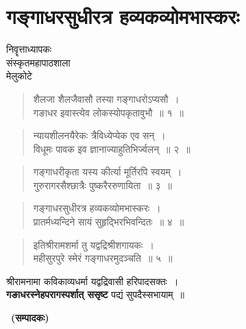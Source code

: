 {\fontsize{15}{17}\selectfont
\chapter{गङ्गाधरसुधीरत्र हव्यकव्योमभास्करः}

\begin{center}
\smallskip

निवॄत्ताध्यापकः\\
संस्कृतमहापाठशाला\\
मेलुकोटे
\addrule
\end{center}

\begin{verse}
शैलजा शैलजैवासौ तस्या गङ्गाधरोऽप्यसौ~।\\
गङाधर इवास्त्येव लोकस्योपकृतावुभौ~॥ १~॥
\end{verse}

\begin{verse}
न्यायशीलनयैरेकः त्रैविध्येप्येक एव सन्~।\\
विधूमः पावक इव ज्ञानाज्याहुतिभिर्ज्वलन्~॥ २~॥
\end{verse}

\begin{verse}
गङ्गाधरीकृता यस्य कीर्त्या मूर्तिरपि स्वयम्~।\\
गुरुरागरसैश्छात्रैः पुष्करैररुणायिता~॥ ३~॥
\end{verse}

\begin{verse}
गङ्गाधरसुधीरत्र हव्यकव्योमभास्करः~।\\
प्रातर्मध्यन्दिने सायं सुहृद्भिरभिवन्दितः~॥ ४~॥
\end{verse}

\begin{verse} 
इतिश्रीरामशर्मा तु यद्वद्रिश्रीशगायकः~।\\
महीसुरपुरे स्मेरं गङ्गाधरमुदञ्चति~॥ ५~॥
\end{verse}

\begin{center}
श्रीरामनामा कविकाव्यधर्मा यद्वद्रिवासी हरिपादसक्तः~।\\
\textbf{गङाधरस्नेहपरागस्पर्शात् ससृष्ट} पद्यं सुपदैस्सभायाम्~॥ 
\end{center}

~\hfill\textbf{(सम्पादकः)}

\articleend
}
